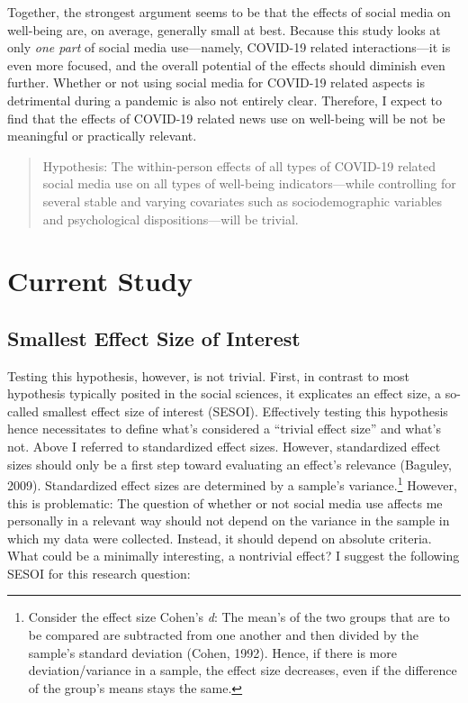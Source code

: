 \documentclass[
  english,
  man,mask,floatsintext]{apa6}
\begin{document}
Together, the strongest argument seems to be that the effects of social media on well-being are, on average, generally small at best.
Because this study looks at only \emph{one part} of social media use---namely, COVID-19 related interactions---it is even more focused, and the overall potential of the effects should diminish even further.
Whether or not using social media for COVID-19 related aspects is detrimental during a pandemic is also not entirely clear.
Therefore, I expect to find that the effects of COVID-19 related news use on well-being will be not be meaningful or practically relevant.

\begin{quote}
Hypothesis: The within-person effects of all types of COVID-19 related social media use on all types of well-being indicators---while controlling for several stable and varying covariates such as sociodemographic variables and psychological dispositions---will be trivial.
\end{quote}

\hypertarget{current-study}{%
\section{Current Study}\label{current-study}}

\hypertarget{smallest-effect-size-of-interest}{%
\subsection{Smallest Effect Size of Interest}\label{smallest-effect-size-of-interest}}

Testing this hypothesis, however, is not trivial.
First, in contrast to most hypothesis typically posited in the social sciences, it explicates an effect size, a so-called smallest effect size of interest (SESOI).
Effectively testing this hypothesis hence necessitates to define what's considered a ``trivial effect size'' and what's not.
Above I referred to standardized effect sizes.
However, standardized effect sizes should only be a first step toward evaluating an effect's relevance (Baguley, 2009).
Standardized effect sizes are determined by a sample's variance.\footnote{Consider the effect size Cohen's \emph{d}: The mean's of the two groups that are to be compared are subtracted from one another and then divided by the sample's standard deviation (Cohen, 1992). Hence, if there is more deviation/variance in a sample, the effect size decreases, even if the difference of the group's means stays the same.}
However, this is problematic: The question of whether or not social media use affects me personally in a relevant way should not depend on the variance in the sample in which my data were collected.
Instead, it should depend on absolute criteria.
What could be a minimally interesting, a nontrivial effect?
I suggest the following SESOI for this research question:
\end{document}
